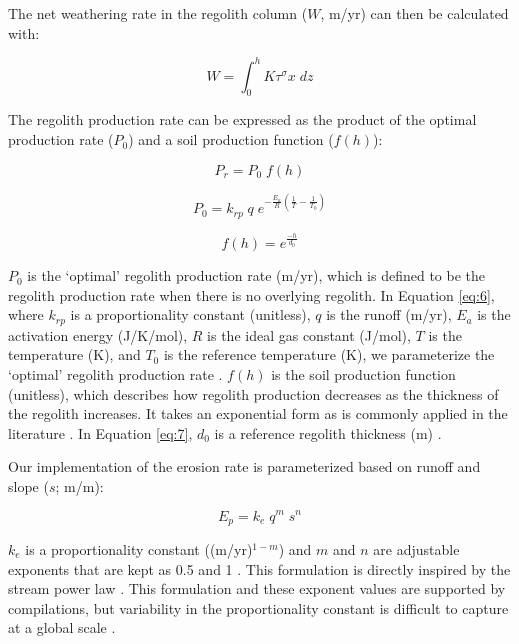 The net weathering rate in the regolith column ($W$, m/yr) can then be calculated with:

\begin{equation}
    W = \int_{0}^{h} K \tau^{\sigma} x\;dz
    \label{eq:4}
\end{equation}

The regolith production rate can be expressed as the product of the optimal production rate ($P_{0}$) and a soil production function ($f(h)$):

\begin{equation}
    P_{r} = P_{0}\;f(h)
    \label{eq:5}
\end{equation}

\begin{equation}
    P_{0} = k_{rp}\;q\;e^{-\frac{E_{a}}{R}\left(\frac{1}{T}-\frac{1}{T_{0}}\right)}
    \label{eq:6}
\end{equation}

\begin{equation}
    f(h) = e^{\frac{-h}{d_{0}}}
    \label{eq:7}
\end{equation}

\noindent
$P_{0}$ is the `optimal' regolith production rate (m/yr), which is defined to be the regolith production rate when there is no overlying regolith. In Equation \ref{eq:6}, where $k_{rp}$ is a proportionality constant (unitless), $q$ is the runoff (m/yr), $E_{a}$ is the activation energy (J/K/mol), $R$ is the ideal gas constant (J/mol), $T$ is the temperature (K), and $T_{0}$ is the reference temperature (K), we parameterize the `optimal' regolith production rate \citep{Carretier2014a}. $f(h)$ is the soil production function (unitless), which describes how regolith production decreases as the thickness of the regolith increases. It takes an exponential form as is commonly applied in the literature \citep{Gabet2009a}. In Equation \ref{eq:7}, $d_{0}$ is a reference regolith thickness (m) \citep{Heimsath1997a}.

Our implementation of the erosion rate is parameterized based on runoff and slope ($s$; m/m):

\begin{equation}
    E_{p} = k_{e}\;q^{m}\;s^{n}
    \label{eq:8}
\end{equation}

\noindent
$k_{e}$ is a proportionality constant ((m/yr)$^{1-m}$) and $m$ and $n$ are adjustable exponents that are kept as 0.5 and 1 \citep{Maffre2018a}. This formulation is directly inspired by the stream power law \citep{Davy2000a}. This formulation and these exponent values are supported by compilations, but variability in the proportionality constant is difficult to capture at a global scale \citep{Lague2013a}.

